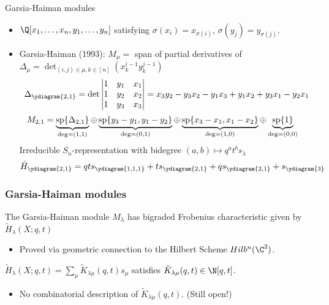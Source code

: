 \documentclass{beamer}
\renewcommand{\Span}{\operatorname{sp}}
\newcounter{c}
\begin{document}
\begin{frame}{Garsia-Haiman modules}
  \begin{itemize}
  \item \(\Q[x_1,\ldots,x_n,y_1,\ldots,y_n]\) satisfying
    \(\sigma(x_i) = x_{\sigma(i)}\), \(\sigma(y_j) = y_{\sigma(j)}\).\pause
  \item Garsia-Haiman (1993): \(M_\mu = \) span of partial derivatives of
    \(\Delta_\mu = \det_{(i,j) \in \mu, k \in [n]} (x_k^{i-1} y_k^{j-1})\) \pause \[
      \Delta_{\ydiagram{2,1}} = \det \left|
        \begin{matrix}
          1 & y_1 & x_1 \\
          1 & y_2 & x_2 \\
          1 & y_3 & x_3
        \end{matrix}
      \right| = x_3 y_2 - y_3 x_2 - y_1 x_3 + y_1 x_2 + y_3 x_1 - y_2 x_1
    \]
    \pause
  \[
    \hspace{-1em}
      M_{2,1} = \underbrace{\Span\{\Delta_{2,1}\}}_{\deg = (1,1)}
      \oplus \underbrace{\Span\{y_3-y_1, y_1 - y_2\}}_{\deg = (0,1)}
      \oplus \underbrace{\Span\{x_3-x_1, x_1 - x_2\}}_{\deg = (1,0)}
      \oplus \underbrace{\Span \{1\}}_{\deg = (0,0)}
    \]
    \pause
    Irreducible \(S_n\)-representation with bidegree \((a,b) \mapsto
    q^at^b s_\lambda\) \pause \[
      \tilde{H}_{\ydiagram{2,1}} = qt s_{\ydiagram{1,1,1}} + t
      s_{\ydiagram{2,1}} + q s_{\ydiagram{2,1}} + s_{\ydiagram{3}}
    \]
  \end{itemize}
\end{frame}
\begin{frame}
  \frametitle{Garsia-Haiman modules}
  \begin{theorem}[Haiman, 2001]
    The Garsia-Haiman module \(M_\lambda\) has bigraded Frobenius
    characteristic given by \(\tilde{H}_\lambda(X;q,t)\)
  \end{theorem}\pause
  \begin{itemize}
  \item Proved via geometric connection to the Hilbert Scheme \(Hilb^n(\C^2)\).\pause
  \end{itemize}
  \begin{corollary}
    \(\tilde{H}_\lambda(X;q,t) = \sum_\mu \tilde{K}_{\lambda \mu}(q,t) s_\mu\)
    satisfies \(\tilde{K}_{\lambda \mu}(q,t) \in \N[q,t]\).
  \end{corollary}\pause
  \begin{itemize}
  \item No combinatorial description of \(\tilde{K}_{\lambda
      \mu}(q,t)\). (Still open!)
  \end{itemize}
  \end{frame}
\end{document}

